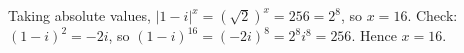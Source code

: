 Taking absolute values, \(|1-i|^x=(\sqrt2)^x=256=2^8\), so \(x=16\). Check: \((1-i)^2=-2i\), so \((1-i)^{16}=(-2i)^8=2^8 i^8=256\). Hence \(x=\boxed{16}\).
